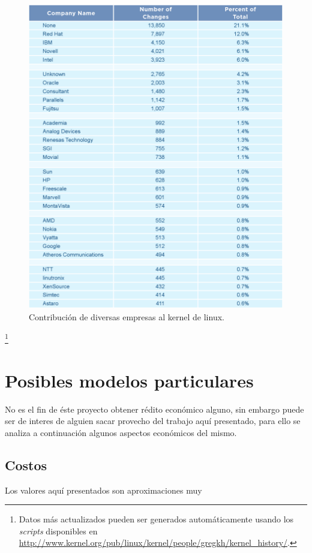\begin{figure}[htp]
\centering
\includegraphics[width=13cm]{./img/table4-companies.png}
\caption{Contribuci\'on de diversas empresas al kernel de linux.}
\label{fig:companies_contributions_to_linux}
\end{figure}\footnote{Datos m\'as actualizados pueden ser generados
autom\'aticamente usando los \emph{scripts} disponibles en
\url{http://www.kernel.org/pub/linux/kernel/people/gregkh/kernel_history/}.}


\section{Posibles modelos particulares}
%
No es el fin de \'este proyecto obtener r\'edito econ\'omico alguno, sin
embargo puede ser de interes de alguien sacar provecho del trabajo aqu\'i
presentado, para ello se analiza a continuaci\'on algunos aspectos
econ\'omicos del mismo.

\subsection{Costos}
Los valores aqu\'i presentados son aproximaciones muy %

